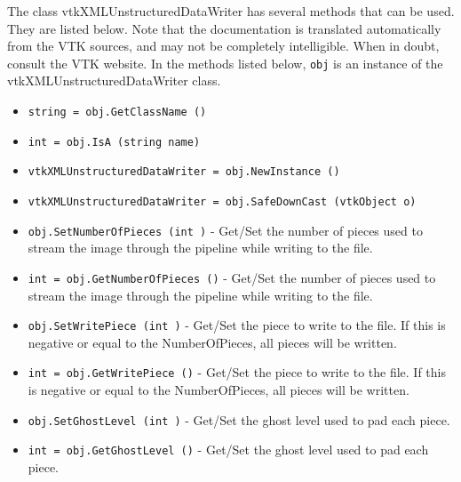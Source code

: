 The class vtkXMLUnstructuredDataWriter has several methods that can be used.
  They are listed below.
Note that the documentation is translated automatically from the VTK sources,
and may not be completely intelligible.  When in doubt, consult the VTK website.
In the methods listed below, \verb|obj| is an instance of the vtkXMLUnstructuredDataWriter class.
\begin{itemize}
\item  \verb|string = obj.GetClassName ()|

\item  \verb|int = obj.IsA (string name)|

\item  \verb|vtkXMLUnstructuredDataWriter = obj.NewInstance ()|

\item  \verb|vtkXMLUnstructuredDataWriter = obj.SafeDownCast (vtkObject o)|

\item  \verb|obj.SetNumberOfPieces (int )| -  Get/Set the number of pieces used to stream the image through the
 pipeline while writing to the file.

\item  \verb|int = obj.GetNumberOfPieces ()| -  Get/Set the number of pieces used to stream the image through the
 pipeline while writing to the file.

\item  \verb|obj.SetWritePiece (int )| -  Get/Set the piece to write to the file.  If this is
 negative or equal to the NumberOfPieces, all pieces will be written.

\item  \verb|int = obj.GetWritePiece ()| -  Get/Set the piece to write to the file.  If this is
 negative or equal to the NumberOfPieces, all pieces will be written.

\item  \verb|obj.SetGhostLevel (int )| -  Get/Set the ghost level used to pad each piece.

\item  \verb|int = obj.GetGhostLevel ()| -  Get/Set the ghost level used to pad each piece.

\end{itemize}
